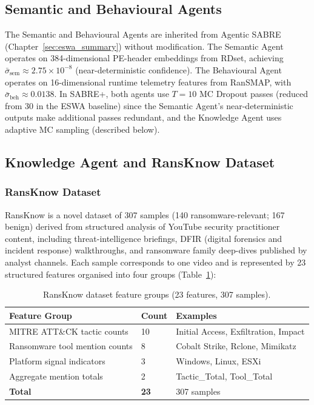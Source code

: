 \subsection{Semantic and Behavioural Agents}

The Semantic and Behavioural Agents are inherited from Agentic SABRE (Chapter~\ref{sec:eswa_summary}) without modification. The Semantic Agent operates on 384-dimensional PE-header embeddings from RDset, achieving $\bar{\sigma}_\text{sem} \approx 2.75 \times 10^{-8}$ (near-deterministic confidence). The Behavioural Agent operates on 16-dimensional runtime telemetry features from RanSMAP, with $\bar{\sigma}_\text{beh} \approx 0.0138$. In SABRE+, both agents use $T = 10$ MC Dropout passes (reduced from 30 in the ESWA baseline) since the Semantic Agent's near-deterministic outputs make additional passes redundant, and the Knowledge Agent uses adaptive MC sampling (described below).

\subsection{Knowledge Agent and RansKnow Dataset}
\label{sec:tifs_knowledge}

\subsubsection{RansKnow Dataset}

RansKnow is a novel dataset of 307 samples (140 ransomware-relevant; 167 benign) derived from structured analysis of YouTube security practitioner content, including threat-intelligence briefings, DFIR (digital forensics and incident response) walkthroughs, and ransomware family deep-dives published by analyst channels. Each sample corresponds to one video and is represented by 23 structured features organised into four groups (Table~\ref{tab:tifs_ransknow}):

\begin{table}[h]
\centering
\caption{RansKnow dataset feature groups (23 features, 307 samples).}
\label{tab:tifs_ransknow}
\begin{tabular}{lll}
\toprule
\textbf{Feature Group} & \textbf{Count} & \textbf{Examples} \\
\midrule
MITRE ATT\&CK tactic counts & 10 & Initial Access, Exfiltration, Impact \\
Ransomware tool mention counts & 8  & Cobalt Strike, Rclone, Mimikatz \\
Platform signal indicators & 3  & Windows, Linux, ESXi \\
Aggregate mention totals & 2  & Tactic\_Total, Tool\_Total \\
\midrule
\textbf{Total} & \textbf{23} & 307 samples \\
\bottomrule
\end{tabular}
\end{table}

